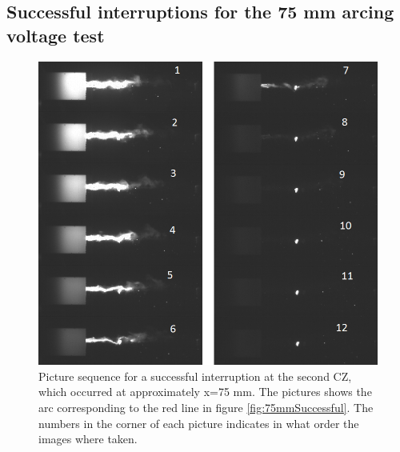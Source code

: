 \documentclass[10pt,b5paper,twoside]{article}
\begin{document}
\subsection{Successful interruptions for the 75 mm arcing voltage test}
\begin{figure}[H]
\centering
\includegraphics[scale=0.7, angle =0 ]{Bilder/Results/124_75_TR_OK.png}
\caption{Picture sequence for a successful interruption at the second CZ, which occurred at approximately x=75 mm. The pictures shows the arc corresponding to the red line in figure \ref{fig:75mmSuccessful}. The numbers in the corner of each picture indicates in what order the images where taken.} \label{fig:arcingVoltage_test_124_red_OK}
\end{figure}
\end{document}
